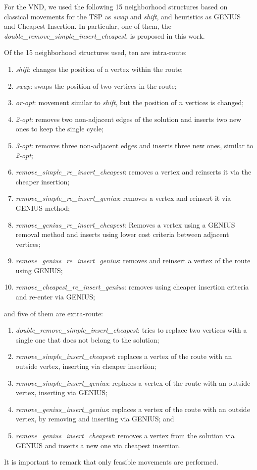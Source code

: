 \documentclass{ro}
\begin{document}
For the VND, we used  the following 15 neighborhood structures based on classical movements for the TSP as \textit{swap} and \textit{shift}, and heuristics as GENIUS and Cheapest Insertion. In particular, 
one of them, the \textit{double\_remove\_\-simple\-\_insert\-\_cheapest}, is proposed in this work. 


Of the 15 neighborhood structures used, ten are intra-route:

	\begin{enumerate}
		\item {\it shift}: changes the position of a vertex within the route;
		\item {\it swap}: swaps the position of two vertices in the route;
		
		\item {\it or-opt}: movement similar to \textit{shift}, but the position of $n$ vertices is changed;%
		\item {\it 2-opt}: removes two non-adjacent edges of the solution and inserts two new ones to keep the single cycle;
		\item {\it 3-opt}: removes three non-adjacent edges and inserts three new ones, similar to {\it 2-opt};
		\item {\it remove\_simple\_re\_insert\_cheapest}: removes a vertex and reinserts it via the cheaper insertion;
		\item {\it remove\_simple\_re\_insert\_genius}: removes a vertex and reinsert it via GENIUS method;
		\item {\it remove\_genius\_re\_insert\_cheapest}: Removes a vertex using a GENIUS removal method and inserts using lower cost criteria between adjacent vertices;
		\item {\it remove\_genius\_re\_insert\_genius}: removes and reinsert a vertex of the route using GENIUS; 
		\item {\it remove\_cheapest\_re\_insert\_genius}: removes using chea\-per insertion criteria and re-enter via GENIUS;
	\end{enumerate}
and five of them are extra-route:
	\begin{enumerate}
		
		
		\item {\it double\_remove\_simple\_insert\_cheapest}: tries to replace two vertices with a single one that does not belong to the solution;
		\item {\it remove\_simple\_insert\_cheapest}: replaces a vertex of the route with an outside vertex, inserting via cheaper insertion;
		\item {\it remove\_simple\_insert\_genius}: replaces a vertex  of the route with an outside vertex, inserting via GENIUS;
		\item {\it remove\_genius\_insert\_genius}: replaces a vertex  of the route with an outside vertex, by removing and inserting via GENIUS; and
		\item {\it remove\_genius\_insert\_cheapest}: removes a vertex from the solution via GENIUS and inserts a new one via cheapest insertion.
	\end{enumerate}
It is important to remark that only feasible movements are performed. 
\end{document}
